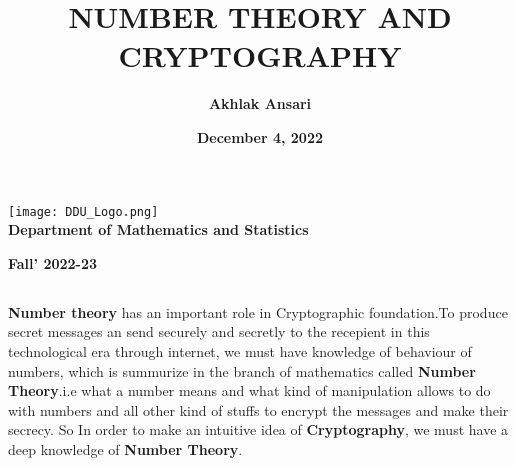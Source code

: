\documentclass[12pt,a4paper]{article}
\title{\bf NUMBER THEORY AND CRYPTOGRAPHY}
\author{\bf Akhlak Ansari}
\date{\bf December 4, 2022}
\begin{document}
    \maketitle

    \pagestyle{fancy}
    \color{black}
    \rhead{\color{blue}{Project:Number Theory and Cryptography}}
    \cfoot{\thepage}

    \begin{center}
      
        \texttt{[image: DDU\_Logo.png]}\\[3mm]
        \textbf{ {\LARGE Department of Mathematics and Statistics}}
       
        \vspace{7.5cm}

        \textbf{Fall' 2022-23}

    \end{center}

    \vspace*{0.13cm}


     \begin{center}
        \section*{\underline{\color{red}{Role of Number Theory in Cryptography}}}
     \end{center}
    
   

    {\bf Number theory} has an important role in Cryptographic foundation.To produce secret messages an send securely and secretly to the recepient in this technological era through internet, we must have knowledge of behaviour of numbers, which is summurize in the branch of mathematics called {\bf Number Theory}.i.e what a number means and what kind of manipulation allows to do with numbers and all other kind of stuffs to encrypt the messages and make their secrecy.
    So In order to make an intuitive idea of {\bf Cryptography}, we must have a deep knowledge of {\bf Number Theory}.

    \vspace*{0.2cm}
\end{document}
